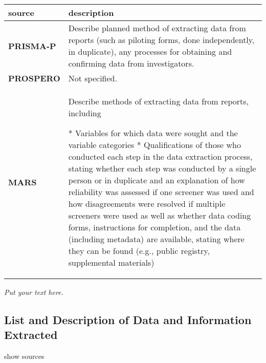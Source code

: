 \documentclass[]{article}
\begin{document}
\hypertarget{edfr}{}
\begin{table}[H]
\centering
\begin{tabular}{>{\bfseries}l|l}
\hline
\rowcolor[HTML]{ececec}  source & description\\
\hline
PRISMA-P & Describe planned method of extracting data from reports (such as piloting forms, done independently, in duplicate), any processes for obtaining and confirming data from investigators.\\
\hline
PROSPERO & Not specified.\\
\hline
MARS & Describe methods of extracting data from reports, including 

* Variables for which data were sought and the variable categories 
* Qualifications of those who conducted each step in the data extraction process, stating whether each step was conducted by a single person or in duplicate and an explanation of how reliability was assessed if one screener was used and how disagreements were resolved if multiple screeners were used as well as whether data coding forms, instructions for completion, and the data (including metadata) are available, stating where they can be found (e.g., public registry, supplemental materials)\\
\hline
\end{tabular}
\end{table}

\emph{Put your text here.}

\hypertarget{list-and-description-of-data-and-information-extracted}{%
\subsection{List and Description of Data and Information
Extracted}\label{list-and-description-of-data-and-information-extracted}}

show sources
\end{document}
